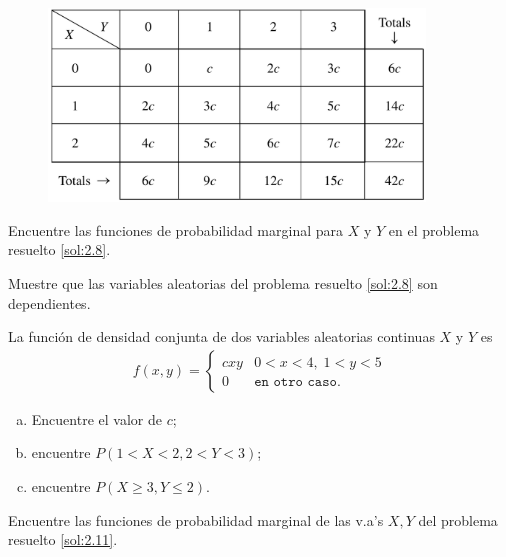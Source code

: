  \begin{figure}
 \centering
 \includegraphics[width=10cm,keepaspectratio=true]{./pe/tab0206.png}
 \label{tab:2.6}
\end{figure}



 \begin{ejemplo}
  \label{sol:2.9}
  Encuentre las funciones de probabilidad marginal para $X$ y $Y$ en el problema resuelto \ref{sol:2.8}.
 \end{ejemplo}



 \begin{ejemplo}
  \label{sol:2.10}
  Muestre que las variables aleatorias del problema resuelto \ref{sol:2.8} son dependientes.
 \end{ejemplo}



 \begin{ejemplo}
  \label{sol:2.11}
  La función de densidad conjunta de dos variables aleatorias continuas $X$ y $Y$ es
  \begin{align}
   f(x,y)=
   \begin{cases}
    cxy & 0<x<4, \; 1<y<5\\
    0 & \texttt{en otro caso}.
   \end{cases}
  \end{align}

 \end{ejemplo}
\begin{enumerate}[(a)]
 \item Encuentre el valor de $c$;
 \item encuentre $P(1<X<2,2<Y<3)$;
 \item encuentre $P(X\geq 3, Y\leq 2)$.
\end{enumerate}



 \begin{ejemplo}
  \label{sol:2.12}
  Encuentre las funciones de probabilidad marginal de las v.a's $X,Y$ del problema resuelto \ref{sol:2.11}.
 \end{ejemplo}




